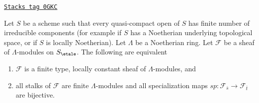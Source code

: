 \begin{lemma}
\label{etale-cohomology-lemma-characterize-locally-constant-module}
\href{https://stacks.math.columbia.edu/tag/0GKC}{\texttt{Stacks tag 0GKC}}

Let $S$ be a scheme such that every quasi-compact open of $S$ has
finite number of irreducible components (for example if $S$ has a
Noetherian underlying topological space, or if $S$ is locally Noetherian).
Let $\Lambda$ be a Noetherian ring.
Let $\mathcal{F}$ be a sheaf of $\Lambda$-modules on $S_\etale$.
The following are equivalent
\begin{enumerate}
\item $\mathcal{F}$ is a finite type, locally constant sheaf
of $\Lambda$-modules, and
\item all stalks of $\mathcal{F}$ are finite $\Lambda$-modules and
all specialization maps
$sp : \mathcal{F}_{\overline{s}} \to \mathcal{F}_{\overline{t}}$
are bijective.
\end{enumerate}
\end{lemma}


